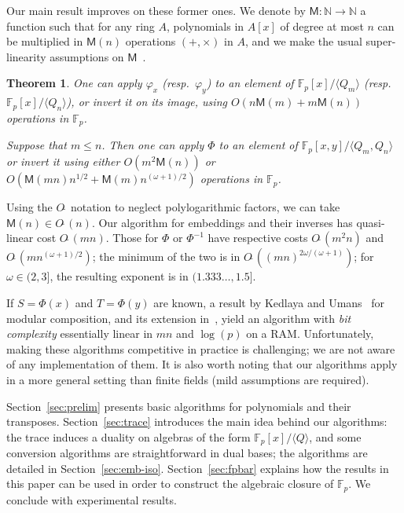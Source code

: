 \documentclass{sig-alternate}
\def\M {\ensuremath{\mathsf{M}}}
\def\N {\ensuremath{\mathbb{N}}}
\def\F {\ensuremath{\mathbb{F}}}
\newcounter{algo}
\newcommand{\ang}[1]{\langle#1\rangle}
\newtheorem{Theo}{Theorem}
\begin{document}
Our main result improves on these former ones. We denote by $\M:\N \to
\N$ a function such that for any ring $A$, polynomials in $A[x]$ of
degree at most $n$ can be multiplied in $\M(n)$ operations
$(+,\times)$ in $A$, and we make the usual super-linearity assumptions
on $\M$~\cite[Chapter~8]{vzGG}.
\begin{Theo}\label{theo:main}
  One can apply $\varphi_x$ (resp.\ $\varphi_y$) to an element of
  $\F_p[x]/\ang{Q_m}$ (resp.\ $\F_p[x]/\ang{Q_n}$), or invert it on its
  image, using $O(n\M(m)+m\M(n))$ operations in $\F_p$.

  Suppose that $m \le n$. Then one can
  apply $\Phi$ to an element of $\F_p[x,y]/\ang{Q_m, Q_n}$ or invert
  it using either $O(m^2 \M(n))$ or $O(\M(mn)n^{1/2}+\M(m)
  n^{(\omega+1)/2} )$ operations in $\F_p$.
\end{Theo}

Using the $O\tilde{~}$ notation to neglect polylogarithmic factors, we
can take $\M(n) \in O\tilde{~}(n)$.  Our algorithm for embeddings and
their inverses has quasi-linear cost $O\tilde{~}(mn)$.  Those for
$\Phi$ or $\Phi^{-1}$ have respective costs $O\tilde{~}(m^2 n)$ and
$O\tilde{~}(m n^{(\omega+1)/2})$; the minimum of the two is in
$O\tilde{~}( (mn)^{2\omega/(\omega+1)})$; for $\omega \in (2,3]$, the
  resulting exponent is in $(1.333\dots, 1.5]$.  

If $S=\Phi(x)$ and $T=\Phi(y)$ are known, a result by Kedlaya and
Umans~\cite{KeUm11} for modular composition, and its extension
in~\cite{PoSc13a}, yield an algorithm with {\em bit complexity}
essentially linear in $mn$ and $\log(p)$ on a RAM. Unfortunately,
making these algorithms competitive in practice is challenging; we are
not aware of any implementation of them. It is also worth noting that
our algorithms apply in a more general setting than finite fields
(mild assumptions are required).

\smallskip{}  Section~\ref{sec:prelim} presents
basic algorithms for polynomials and their transposes.
Section~\ref{sec:trace} introduces the main idea behind our
algorithms: the trace induces a duality on algebras of the form
$\F_p[x]/\ang{Q}$, and some conversion algorithms are straightforward
in dual bases; the algorithms are detailed in
Section~\ref{sec:emb-iso}. Section~\ref{sec:fpbar} explains how the
results in this paper can be used in order to construct the algebraic
closure of $\F_p$. We conclude with experimental results.

\end{document}
